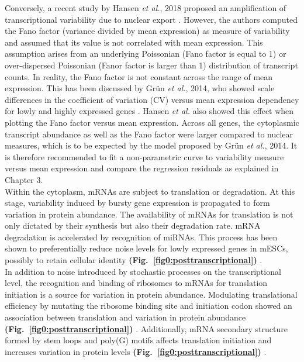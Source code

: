 Conversely, a recent study by Hansen \emph{et al.}, 2018 proposed an amplification of transcriptional variability due to nuclear export \cite{Hansen2018}. 
However, the authors computed the Fano factor (variance divided by mean expression) as measure of variability and assumed that its value is not correlated with mean expression. 
This assumption arises from an underlying Poissonian (Fano factor is equal to 1) or over-dispersed Poissonian (Fanor factor is larger than 1) distribution of transcript counts.
In reality, the Fano factor is not constant across the range of mean expression. 
This has been discussed by Gr\"un \emph{et al.}, 2014, who showed scale differences in the coefficient of variation (CV) versus mean expression dependency for lowly and highly expressed genes \cite{Grun2014}.
Hansen \emph{et al.} also showed this effect when plotting the Fano factor versus mean expression.
Across all genes, the cytoplasmic transcript abundance as well as the Fano factor were larger compared to nuclear measures, which is to be expected by the model proposed by Gr\"un \emph{et al.}, 2014.
It is therefore recommended to fit a non-parametric curve to variability measure versus mean expression and compare the regression residuals as explained in Chapter 3.\\

Within the cytoplasm, mRNAs are subject to translation or degradation. 
At this stage, variability induced by bursty gene expression is propagated to form variation in protein abundance. 
The availability of mRNAs for translation is not only dictated by their synthesis but also their degradation rate. 
mRNA degradation is accelerated by recognition of \glspl{miRNA}. 
This process has been shown to preferentially reduce noise levels for lowly expressed genes in mESCs, possibly to retain cellular identity \textbf{(Fig.~\ref{fig0:posttranscriptional})} \citep{Schmiedel2015}. 
\\

In addition to noise introduced by stochastic processes on the transcriptional level, the recognition and binding of ribosomes to mRNAs for translation initiation is a source for variation in protein abundance. 
Modulating translational efficiency by mutating the ribosome binding site and initiation codon showed an association between translation and variation in protein abundance \textbf{(Fig.~\ref{fig0:posttranscriptional})} \citep{Ozbudak2002}. 
Additionally, mRNA secondary structure formed by stem loops and poly(G) motifs affects translation initiation and increases variation in protein levels \textbf{(Fig.~\ref{fig0:posttranscriptional})} \citep{Dacheux2017a}.\\

